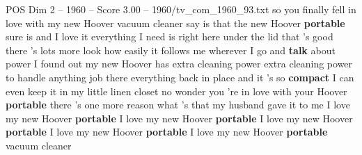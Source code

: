 \begin{textsample}{POS Dim 2 – 1960 – Score 3.00 – 1960/tv\_com\_1960\_93.txt}  \label{ex:f2_pos_025}
so you finally fell in love with my new Hoover vacuum cleaner say is that the new Hoover \textbf{portable} sure is and I love it everything I need is right here under the lid that 's good there 's lots more look how easily it follows me wherever I go and \textbf{talk} about power I found out my new Hoover has extra cleaning power extra cleaning power to handle anything job there everything back in place and it 's so \textbf{compact} I can even keep it in my little linen closet no wonder you 're in love with your Hoover \textbf{portable} there 's one more reason what 's that my husband gave it to me I love my new Hoover \textbf{portable} I love my new Hoover \textbf{portable} I love my new Hoover \textbf{portable} I love my new Hoover \textbf{portable} I love my new Hoover \textbf{portable} vacuum cleaner

\end{textsample}
